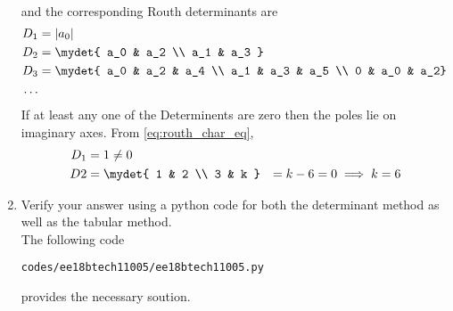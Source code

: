 \begin{enumerate}[label=\thesection.\arabic*.,ref=\thesection.\theenumi]
\begin{align}
\end{align}
and the corresponding Routh determinants are
\begin{align}
D_1 &= |a_0|
\\
D_2 &= 
\mydet{
a_0 & a_2 
\\ 
a_1 & a_3
} 
\\
D_3 &=\mydet{
a_0 & a_2 & a_4 
\\ a_1 & a_3 & a_5 
\\ 0 & a_0 & a_2}
\\
\dots
\end{align}
If at least any one of the Determinents are zero then the poles lie on imaginary axes.  From \eqref{eq:routh_char_eq},
%
\begin{align}
D_1 &= 1 \ne 0
\\
D2 &= \mydet{
1 & 2 \\ 3 & k } 
&= k-6 =0 \implies k = 6
\end{align}
%
\item Verify your answer using a python code for both the determinant method as well as the tabular method.
\\
\solution 
The following code 
%
\begin{lstlisting}
codes/ee18btech11005/ee18btech11005.py
\end{lstlisting}
%
provides the necessary soution.
\end{enumerate}



